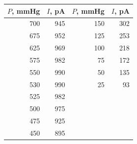 \documentclass[a4paper, 12pt]{article}
\begin{document}
\begin{enumerate}
\begin{minipage}{0.45\textwidth}
		
		\end{minipage}
		\hspace{0.1cm}
		\begin{minipage}{0.5\textwidth}
		    \label{table:current}
		    \centering
                \begin{tabular}{|r|r|r|r|}
                \hline
                \multicolumn{1}{|l|}{$P$, mmHg} & \multicolumn{1}{l|}{$I$, pA} & \multicolumn{1}{l|}{$P$, mmHg} & \multicolumn{1}{l|}{$I$, pA} \\ \hline
                700                                 & 945                          & 150                                & 302                          \\ \hline
                675                                 & 952                          & 125                                & 253                          \\ \hline
                625                                 & 969                          & 100                                & 218                          \\ \hline
                575                                 & 982                          & 75                                 & 172                          \\ \hline
                550                                 & 990                          & 50                                 & 135                          \\ \hline
                530                                 & 990                          & 25                                 & 93                           \\ \hline
                525                                 & 982                          &                                    &                              \\ \hline
                500                                 & 975                          &                                    &                              \\ \hline
                475                                 & 925                          &                                    &                              \\ \hline
                450                                 & 895                          &                                    &                              \\ \hline

\end{tabular}
\end{minipage}
\end{enumerate}
\end{document}

